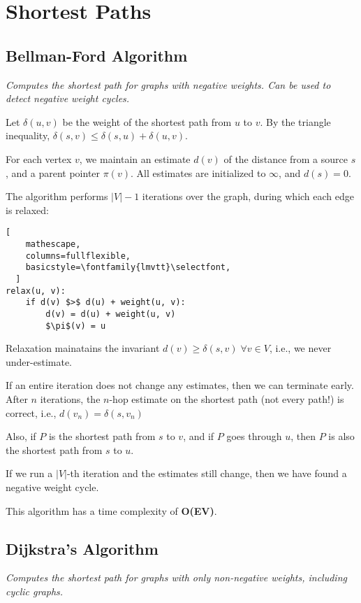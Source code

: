 \section{Shortest Paths}

\subsection{Bellman-Ford Algorithm}
\emph{Computes the shortest path for graphs with negative weights.
Can be used to detect negative weight cycles.}

Let $\delta(u, v)$ be the weight of the shortest path from $u$ to $v$.
By the triangle inequality, $\delta(s, v) \leq \delta(s, u) + \delta(u, v)$.

For each vertex $v$, we maintain an estimate $d(v)$ of the distance from a source $s$, and a parent pointer $\pi(v)$.
All estimates are initialized to $\infty$, and $d(s) = 0$.

The algorithm performs $|V| - 1$ iterations over the graph, during which each edge is relaxed:

\begin{lstlisting}[
    mathescape,
    columns=fullflexible,
    basicstyle=\fontfamily{lmvtt}\selectfont,
  ]
relax(u, v):
    if d(v) $>$ d(u) + weight(u, v):
        d(v) = d(u) + weight(u, v)
        $\pi$(v) = u
\end{lstlisting}

Relaxation mainatains the invariant $d(v) \geq \delta(s, v) \; \forall v \in V$, i.e., we never under-estimate.

If an entire iteration does not change any estimates, then we can terminate early.
After $n$ iterations, the $n$-hop estimate on the shortest path (not every path!) is correct, i.e., $d(v_n) = \delta(s, v_n)$

Also, if $P$ is the shortest path from $s$ to $v$, and if $P$ goes through $u$, then $P$ is also the shortest
path from $s$ to $u$.

If we run a $|V|$-th iteration and the estimates still change, then we have found a negative weight cycle.

This algorithm has a time complexity of \textbf{O(EV)}.

\subsection{Dijkstra's Algorithm}
\emph{Computes the shortest path for graphs with only non-negative weights, including cyclic graphs.}

